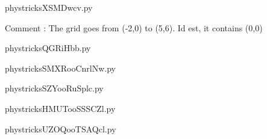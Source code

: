     \newcommand{\CaptionFigXSMDwcv}{<+Type your caption here+>}
    \begin{center}
        
    \end{center}
    phystricksXSMDwcv.py

    Comment : The grid goes from (-2,0) to (5,6). Id est, it contains (0,0)

    \clearpage
    


    \newcommand{\CaptionFigQGRiHbb}{<+Type your caption here+>}
    \begin{center}
        
    \end{center}
    phystricksQGRiHbb.py

    

    \clearpage
    


    \newcommand{\CaptionFigSMXRooCnrlNw}{<+Type your caption here+>}
    \begin{center}
        
    \end{center}
    phystricksSMXRooCnrlNw.py

    

    \clearpage
    


    \newcommand{\CaptionFigSZYooRuSplc}{<+Type your caption here+>}
    \begin{center}
        
    \end{center}
    phystricksSZYooRuSplc.py

    

    \clearpage
    


    \newcommand{\CaptionFigHMUTooSSSCZl}{<+Type your caption here+>}
    \begin{center}
        
    \end{center}
    phystricksHMUTooSSSCZl.py

    

    \clearpage
    


    \newcommand{\CaptionFigUZOQooTSAQcl}{<+Type your caption here+>}
    \begin{center}
        
    \end{center}
    phystricksUZOQooTSAQcl.py

